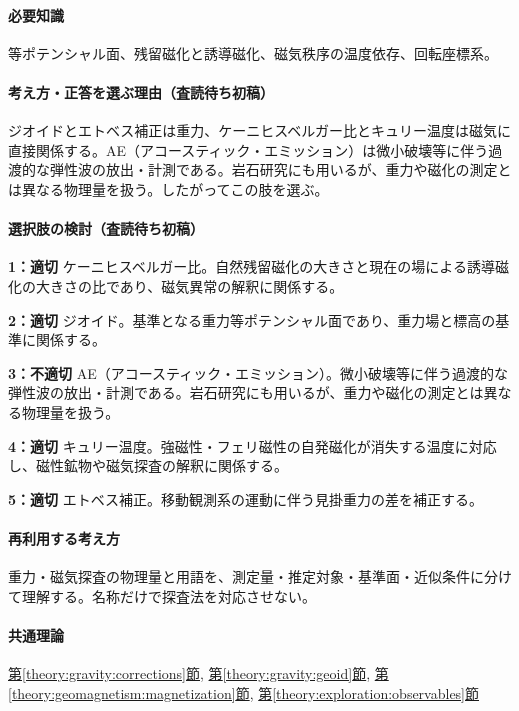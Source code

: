 \paragraph{必要知識} 等ポテンシャル面、残留磁化と誘導磁化、磁気秩序の温度依存、回転座標系。

\paragraph{考え方・正答を選ぶ理由（査読待ち初稿）} ジオイドとエトベス補正は重力、ケーニヒスベルガー比とキュリー温度は磁気に直接関係する。AE（アコースティック・エミッション）は微小破壊等に伴う過渡的な弾性波の放出・計測である。岩石研究にも用いるが、重力や磁化の測定とは異なる物理量を扱う。したがってこの肢を選ぶ。

\paragraph{選択肢の検討（査読待ち初稿）}\mbox{}\par

\noindent\textbf{1：適切} ケーニヒスベルガー比。自然残留磁化の大きさと現在の場による誘導磁化の大きさの比であり、磁気異常の解釈に関係する。\par

\noindent\textbf{2：適切} ジオイド。基準となる重力等ポテンシャル面であり、重力場と標高の基準に関係する。\par

\noindent\textbf{3：不適切} AE（アコースティック・エミッション）。微小破壊等に伴う過渡的な弾性波の放出・計測である。岩石研究にも用いるが、重力や磁化の測定とは異なる物理量を扱う。\par

\noindent\textbf{4：適切} キュリー温度。強磁性・フェリ磁性の自発磁化が消失する温度に対応し、磁性鉱物や磁気探査の解釈に関係する。\par

\noindent\textbf{5：適切} エトベス補正。移動観測系の運動に伴う見掛重力の差を補正する。\par

\paragraph{再利用する考え方} 重力・磁気探査の物理量と用語を、測定量・推定対象・基準面・近似条件に分けて理解する。名称だけで探査法を対応させない。

\paragraph{共通理論} \hyperref[theory:gravity:corrections]{第\ref*{theory:gravity:corrections}節}, \hyperref[theory:gravity:geoid]{第\ref*{theory:gravity:geoid}節}, \hyperref[theory:geomagnetism:magnetization]{第\ref*{theory:geomagnetism:magnetization}節}, \hyperref[theory:exploration:observables]{第\ref*{theory:exploration:observables}節}

